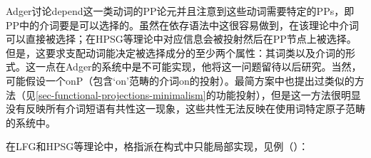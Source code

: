 Adger讨论depend这一类动词的PP论元并且注意到这些动词需要特定的PPs，即PP中的介词要是可以选择的。虽然在依存语法中这很容易做到，在该理论中介词可以直接被选择；在HPSG等理论中对应信息会被投射然后在PP节点上被选择。但是，这要求支配动词能决定被选择成分的至少两个属性：其词类以及介词的形式。这一点在Adger的系统中是不可能实现，他将这一问题留待以后研究。当然，可能假设一个onP（包含‘on’范畴的介词on的投射）。最简方案中也提出过类似的方法（见\ref{sec-functional-projections-minimalism}的功能投射），但是这一方法很明显没有反映所有介词短语有共性这一现象，这些共性无法反映在使用词特定原子范畴的系统中。

在LFG\indexlfgc 和HPSG\indexhpsgc 等理论中，格指派在构式中只能局部实现，见例（）：


